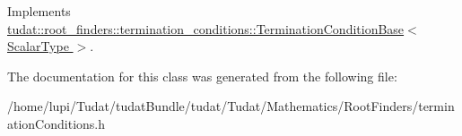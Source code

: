 Implements \hyperlink{classtudat_1_1root__finders_1_1termination__conditions_1_1TerminationConditionBase_a54a1719f2a979d8ca0bafdc835ad180d}{tudat\+::root\+\_\+finders\+::termination\+\_\+conditions\+::\+Termination\+Condition\+Base$<$ Scalar\+Type $>$}.



The documentation for this class was generated from the following file\+:\begin{DoxyCompactItemize}
\item 
/home/lupi/\+Tudat/tudat\+Bundle/tudat/\+Tudat/\+Mathematics/\+Root\+Finders/termination\+Conditions.\+h\end{DoxyCompactItemize}
